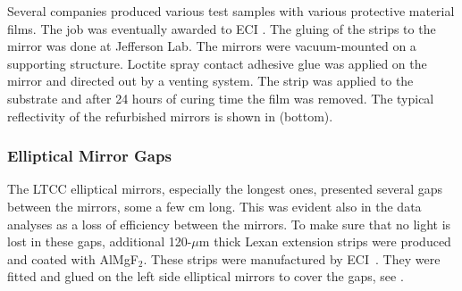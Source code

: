 Several companies produced various test samples with various protective material films. The job was eventually awarded to ECI \cite{ECI}.
The gluing of the strips to the mirror was done at Jefferson Lab. The mirrors were vacuum-mounted on a
supporting structure.
Loctite spray contact adhesive glue was applied on the mirror and directed out by a venting system.
The strip was applied to the substrate and after 24 hours of curing time the film was removed.
The typical reflectivity of the refurbished mirrors is shown in  (bottom).


\subsubsection{Elliptical Mirror Gaps}

The LTCC elliptical mirrors, especially the longest ones, presented several gaps between the mirrors, some a few cm long.
This was evident also in the data analyses as a loss of efficiency between the mirrors.
To make sure that no light is lost in these gaps, additional 120-$\mu$m thick Lexan extension strips were produced
and coated with AlMgF$_2$.
These strips were manufactured by ECI~\cite{ECI}. They were fitted and glued on the left side elliptical mirrors to
cover the gaps, see .

